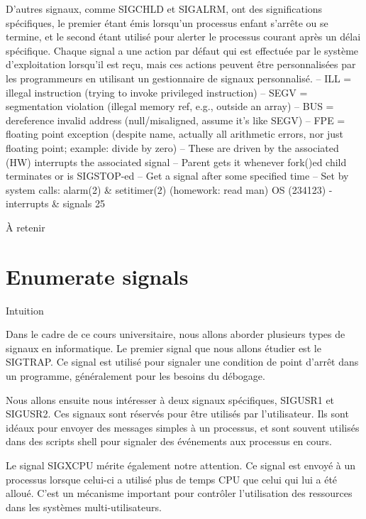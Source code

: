 \documentclass[12pt]{article}
\begin{document}
D'autres signaux, comme SIGCHLD et SIGALRM, ont des significations spécifiques, le premier étant émis lorsqu'un processus enfant s'arrête ou se termine, et le second étant utilisé pour alerter le processus courant après un délai spécifique. Chaque signal a une action par défaut qui est effectuée par le système d'exploitation lorsqu'il est reçu, mais ces actions peuvent être personnalisées par les programmeurs en utilisant un gestionnaire de signaux personnalisé.
– ILL = illegal instruction (trying to invoke privileged instruction)
– SEGV = segmentation violation (illegal memory ref, e.g., outside an array)
– BUS = dereference invalid address (null/misaligned, assume it’s like SEGV)
– FPE = floating point exception (despite name, actually all arithmetic
errors, nor just floating point; example: divide by zero)
– These are driven by the associated (HW) interrupts
the associated signal
– Parent gets it whenever fork()ed child terminates or is SIGSTOP-ed
– Get a signal after some specified time
– Set by system calls: alarm(2) \& setitimer(2) (homework: read man)
OS (234123) - interrupts \& signals
25
\begin{aretenir}{À retenir}
\end{aretenir}

\section{Enumerate signals}
\begin{myvulga}{Intuition}
\end{myvulga}
Dans le cadre de ce cours universitaire, nous allons aborder plusieurs types de signaux en informatique. Le premier signal que nous allons étudier est le SIGTRAP. Ce signal est utilisé pour signaler une condition de point d'arrêt dans un programme, généralement pour les besoins du débogage.

Nous allons ensuite nous intéresser à deux signaux spécifiques, SIGUSR1 et SIGUSR2. Ces signaux sont réservés pour être utilisés par l'utilisateur. Ils sont idéaux pour envoyer des messages simples à un processus, et sont souvent utilisés dans des scripts shell pour signaler des événements aux processus en cours.

Le signal SIGXCPU mérite également notre attention. Ce signal est envoyé à un processus lorsque celui-ci a utilisé plus de temps CPU que celui qui lui a été alloué. C'est un mécanisme important pour contrôler l'utilisation des ressources dans les systèmes multi-utilisateurs.
\end{document}
